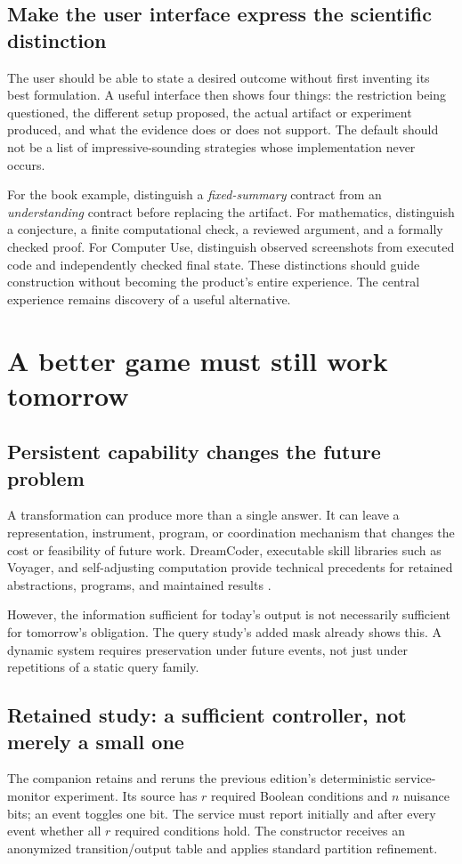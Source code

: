 \documentclass[11pt,letterpaper]{article}
\theoremstyle{remark}\newtheorem{remark}{Remark}[section]
\begin{document}
\subsection{Make the user interface express the scientific distinction}
The user should be able to state a desired outcome without first inventing its best formulation. A useful interface then shows four things: the restriction being questioned, the different setup proposed, the actual artifact or experiment produced, and what the evidence does or does not support. The default should not be a list of impressive-sounding strategies whose implementation never occurs.

For the book example, distinguish a \emph{fixed-summary} contract from an \emph{understanding} contract before replacing the artifact. For mathematics, distinguish a conjecture, a finite computational check, a reviewed argument, and a formally checked proof. For Computer Use, distinguish observed screenshots from executed code and independently checked final state. These distinctions should guide construction without becoming the product's entire experience. The central experience remains discovery of a useful alternative.

\section{A better game must still work tomorrow}\label{sec:future}
\subsection{Persistent capability changes the future problem}
A transformation can produce more than a single answer. It can leave a representation, instrument, program, or coordination mechanism that changes the cost or feasibility of future work. DreamCoder, executable skill libraries such as Voyager, and self-adjusting computation provide technical precedents for retained abstractions, programs, and maintained results \citep{ellis2020,wang2023,acar2011}.

However, the information sufficient for today's output is not necessarily sufficient for tomorrow's obligation. The query study's added mask already shows this. A dynamic system requires preservation under future events, not just under repetitions of a static query family.

\subsection{Retained study: a sufficient controller, not merely a small one}
The companion retains and reruns the previous edition's deterministic service-monitor experiment. Its source has $r$ required Boolean conditions and $n$ nuisance bits; an event toggles one bit. The service must report initially and after every event whether all $r$ required conditions hold. The constructor receives an anonymized transition/output table and applies standard partition refinement.
\end{document}
